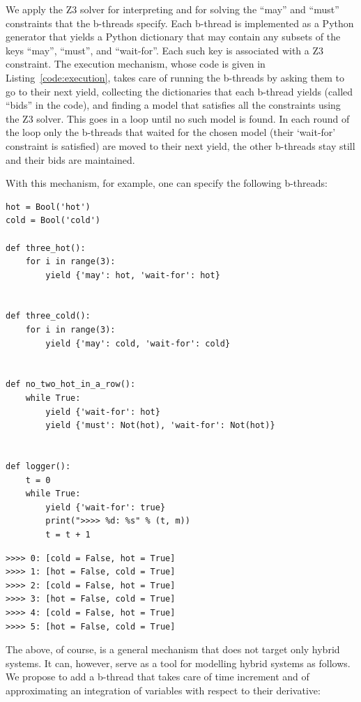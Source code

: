 \documentclass[11pt]{article}
\newcounter{example}
\begin{document}
We apply the Z3 solver for interpreting and for solving the ``may'' and ``must'' constraints that the b-threads specify. Each b-thread is implemented as a Python generator that yields a Python dictionary that may contain any subsets of the keys ``may'', ``must'', and ``wait-for''. Each such key is associated with a Z3 constraint. The execution mechanism, whose code is given in Listing~\ref{code:execution}, takes care of running the b-threads by asking them to go to their next yield, collecting the dictionaries that each b-thread yields (called ``bids'' in the code), and finding a model that satisfies all the constraints using the Z3 solver. This goes in a loop until no such model is found. In each round of the loop only the b-threads that waited for the chosen model (their `wait-for' constraint is satisfied) are moved to their next yield, the other b-threads stay still and their bids are maintained. 

With this mechanism, for example, one can specify the following b-threads:
\begin{lstlisting}[caption={A simple example of a program that uses the solver based execution mechanism.},captionpos=b,frame = single]
hot = Bool('hot')
cold = Bool('cold')

def three_hot():
	for i in range(3):
		yield {'may': hot, 'wait-for': hot}


def three_cold():
	for i in range(3):
		yield {'may': cold, 'wait-for': cold}


def no_two_hot_in_a_row():
	while True:
		yield {'wait-for': hot}
		yield {'must': Not(hot), 'wait-for': Not(hot)}


def logger():
	t = 0
	while True:
		yield {'wait-for': true}
		print(">>>> %d: %s" % (t, m))
		t = t + 1 
\end{lstlisting}

\begin{lstlisting}[caption={The output of the above program.},captionpos=b,frame = single]
>>>> 0: [cold = False, hot = True]
>>>> 1: [hot = False, cold = True]
>>>> 2: [cold = False, hot = True]
>>>> 3: [hot = False, cold = True]
>>>> 4: [cold = False, hot = True]
>>>> 5: [hot = False, cold = True]
\end{lstlisting}

The above, of course, is a general mechanism that does not target only hybrid systems. It can, however, serve as a tool for modelling hybrid systems as follows. We propose to add a b-thread that takes care of time increment and of approximating an integration of variables with respect to their derivative: 
\end{document}

